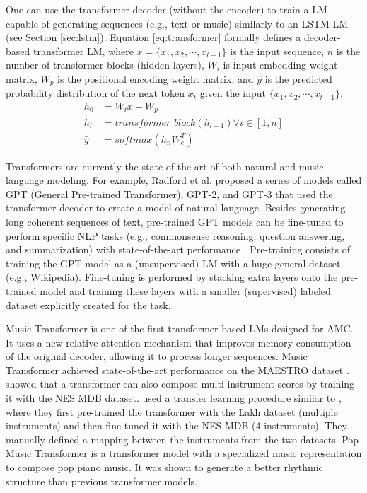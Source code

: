 One can use the transformer decoder (without the encoder) to train a LM capable of generating sequences (e.g., text or music) similarly to an LSTM LM (see Section \ref{sec:lstm}). Equation \ref{eq:transformer} formally defines a decoder-based transformer LM, where $x = \{x_1, x_2, \cdots, x_{t-1}\}$ is the input sequence, $n$ is the number of transformer blocks (hidden layers), $W_i$ is input embedding weight matrix, $W_p$ is the positional encoding weight matrix, and $\hat{y}$ is the predicted probability distribution of the next token $x_t$ given the input $\{x_1, x_2, \cdots, x_{t-1}\}$.
\begin{equation}\label{eq:transformer}
\begin{split}
    h_0 &= W_ix + W_p \\
    h_l &= transformer\_block(h_{l-1}) \forall i \in [1,n] \\
    \hat{y} &= softmax(h_nW_e^T)
\end{split}
\end{equation}

Transformers are currently the state-of-the-art of both natural and music language modeling. For example, Radford et al. \cite{Radford2018, radford2019language} proposed a series of models called GPT (General Pre-trained Transformer), GPT-2, and GPT-3 that used the transformer decoder to create a model of natural language. Besides generating long coherent sequences of text, pre-trained GPT models can be fine-tuned to perform specific NLP tasks (e.g., commonsense reasoning, question answering, and summarization) with state-of-the-art performance \cite{radford2019language}. Pre-training consists of training the GPT model as a (unsupervised) LM with a huge general dataset (e.g., Wikipedia). Fine-tuning is performed by stacking extra layers onto the pre-trained model and training these layers with a smaller (supervised) labeled dataset explicitly created for the task.

Music Transformer \cite{huang2018music} is one of the first transformer-based LMs designed for AMC. It uses a new relative attention mechanism that improves memory consumption of the original decoder, allowing it to process longer sequences. Music Transformer achieved state-of-the-art performance on the MAESTRO dataset \cite{hawthorne2018enabling}. \citet{donahue2019lakhnes} showed that a transformer can also compose multi-instrument scores by training it with the NES MDB \cite{donahue2018nesmdb} dataset. \citet{donahue2018nesmdb} used a transfer learning procedure similar to \citet{Radford2018}, where they first pre-trained the transformer with the Lakh dataset (multiple instruments) and then fine-tuned it with the NES-MDB (4 instruments). They manually defined a mapping between the instruments from the two datasets. Pop Music Transformer \cite{huang2020pop} is a transformer model with a specialized music representation to compose pop piano music. It was shown to generate a better rhythmic structure than previous transformer models.

